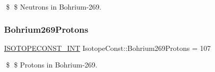 \$ \$ Neutrons in Bohrium-\/269. \mbox{\label{group___isotope_const-_bohrium-_bh269_ga0a7a2a96b3a26e07556b8cd0b2fb0b21}} 
\subsubsection{\texorpdfstring{Bohrium269\+Protons}{Bohrium269Protons}}
{\footnotesize\ttfamily \mbox{\hyperlink{group___isotope_const-_macros_ga5f18360b3e99483a35c32d789e62621c}{I\+S\+O\+T\+O\+P\+E\+C\+O\+N\+S\+T\+\_\+\+I\+NT}} Isotope\+Const\+::\+Bohrium269\+Protons = 107}

\$ \$ Protons in Bohrium-\/269. 